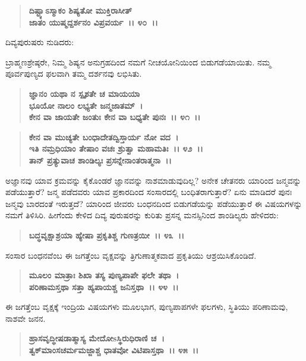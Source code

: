 \begin{verse}
\textbf{ದಿಷ್ಟ್ಯಾಽಸ್ಮಾಕಂ ಶಿಷ್ಯತೋ ಮುಕ್ತಿರಾಸೀತ್}\\\textbf{ಜಾತಂ ಯುಷ್ಮದ್ದರ್ಶನಂ ವಿಪ್ರವರ್ಯ~।। ೪೦~।।}
\end{verse}

\begin{flushleft}
ದಿವ್ಯಪುರುಷರು ನುಡಿದರು:
\end{flushleft}

ಬ್ರಾಹ್ಮಣಶ್ರೇಷ್ಠರೇ, ನಿಮ್ಮ ಶಿಷ್ಯನ ಅನುಗ್ರಹದಿಂದ ನಮಗೆ ನೀಚಯೋನಿಯಿಂದ ಬಿಡುಗಡೆಯಾಯಿತು. ನಮ್ಮ ಪೂರ್ವಪುಣ್ಯದ ಫಲವಾಗಿ ತಮ್ಮ ದರ್ಶನವು ಲಭಿಸಿತು.

\begin{verse}
\textbf{ಜ್ಞಾನಂ ಯಥಾ ನ ಸ್ಪೃಶತೇ ಚ ಮಾಯಯಾ}\\\textbf{ಭೂಯೋ ನಾಲಂ ಲಭ್ಯತೇ ಜನ್ಮಜಾತಮ್~। }\\\textbf{ಕೇನ ವಾ ಜಾಯತೇ ಜಂತುಃ ಕೇನ ವಾ ಬಧ್ಯತೇ ಪುನಃ~।। ೪೧~।। }
\end{verse}

\begin{verse}
\textbf{ಕೇನ ವಾ ಮುಚ್ಯತೇ ಬಂಧಾದೇತದ್ವಿಸ್ತಾರ್ಯ ನೋ ವದ~।}\\\textbf{ಇತಿ ನಮ್ರಧಿಯಾಂ ತೇಷಾಂ ವಚಃ ಶ್ರುತ್ವಾ ಮಹಾಮತಿಃ~।। ೪೨~।।}\\\textbf{ತಾನ್ ಪ್ರತ್ಯುವಾಚ ಶಾಂಡಿಲ್ಯಃ ಪ್ರಸನ್ನೇನಾಂತರಾತ್ಮನಾ~।।}
\end{verse}

ಅಜ್ಞಾನವು ಯಾವ ಕ್ರಮವನ್ನು ಕೈಕೊಂಡರೆ ಜ್ಞಾನವನ್ನು ನಾಶಮಾಡುವುದಿಲ್ಲ? ಅನೇಕ ಚೇತನರು ಯಾರಿಂದ ಜನ್ಮವನ್ನು ಪಡೆಯುತ್ತಾರೆ? ಜನ್ಮ ಪಡೆದವರು ಯಾವ ಪ್ರಕಾರದಿಂದ ಸಂಸಾರದಲ್ಲಿ ಬಂಧಿತರಾಗುತ್ತಾರೆ? ಏನು ಮಾಡಿದರೆ ಪುನಃ ಜನ್ಮವು ಬಾರದಂತೆ ಇರುತ್ತದೆ? ಯಾರಿಂದ ಜೀವರು ಬಂಧನದಿಂದ ಬಿಡುಗಡೆಯನ್ನು ಪಡೆಯುತ್ತಾರೆ \enginline{-}ಈ ವಿಷಯಗಳನ್ನು ನಮಗೆ ತಿಳಿಸಿರಿ. ಹೀಗೆಂದು ಕೇಳಿದ ದಿವ್ಯ ಪುರುಷರನ್ನು ಕುರಿತು ಪ್ರಸನ್ನ ಮನಸ್ಸಿನಿಂದ ಶಾಂಡಿಲ್ಯರು ಹೇಳಿದರು:

\begin{verse}
\textbf{ಬದ್ಧವೃಕ್ಷಾಶ್ರಯಾ ಹ್ಯೇಷಾ ಪ್ರಕೃತಿಶ್ಚ ಗುಣತ್ರಯೀ~।। ೪೩~।।}
\end{verse}

ಸಂಸಾರ ಬಂಧನವೆಂಬ ಈ ಜಗತ್ತೆಂಬ ವೃಕ್ಷವನ್ನು ತ್ರಿಗುಣಾತ್ಮಕವಾದ ಪ್ರಕೃತಿಯು ಆಶ್ರಯಿಸಿಕೊಂಡಿದೆ.

\begin{verse}
\textbf{ಮೂಲಂ ಮಾತ್ರಾಃ ಶಿಖಾ ತಸ್ಯ ಪುಣ್ಯಪಾಪೇ ಫಲೇ ತಥಾ~।}\\\textbf{ಪರಿಣಾಮಸ್ತಥಾ ಸತ್ತಾ ಹ್ಯಪಾಯಶ್ಚ ಜನಿಸ್ತಥಾ~।। ೪೪~।।}
\end{verse}

ಈ ಜಗತ್ತೆಂಬ ವೃಕ್ಷಕ್ಕೆ ಇಂದ್ರಿಯ ವಿಷಯಗಳು ಮೂಲಭಾಗ, ಪುಣ್ಯಪಾಪಗಳೇ ಫಲಗಳು, ಸ್ಥಿತಿಯು ಪರಿಣಾಮವು, ನಾಶವೇ ಜನನ.

\begin{verse}
\textbf{ಹ್ರಾಸವೃದ್ಧೀಷಡಾತ್ಮಾಸ್ಯ ಮೇದೋsಸ್ಥಿರುಧಿರಾಣಿ ಚ~।}\\\textbf{ತ್ವಕ್‌ಮಾಂಸಚರ್ಮಮಜ್ಜಾಶ್ಚ ಧಾತವೋ ವಿಟಿಪಾಸ್ತಥಾ~।। ೪೫~।।}
\end{verse}

